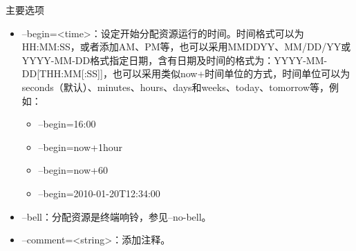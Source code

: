 \begin{frame}{主要选项}
\begin{itemize}
    \item --begin=<time>：设定开始分配资源运行的时间。时间格式可以为HH:MM:SS，或者添加AM、PM等，也可以采用MMDDYY、MM/DD/YY或YYYY-MM-DD格式指定日期，含有日期及时间的格式为：YYYY-MM-DD[THH:MM[:SS]]，也可以采用类似now+时间单位的方式，时间单位可以为seconds（默认）、minutes、hours、days和weeks、today、tomorrow等，例如：
\begin{itemize}
	\item --begin=16:00
    \item --begin=now+1hour
    \item --begin=now+60
    \item --begin=2010-01-20T12:34:00
\end{itemize}
    \item --bell：分配资源是终端响铃，参见--no-bell。
    \item --comment=<string>：添加注释。

\end{itemize}
\end{frame}
